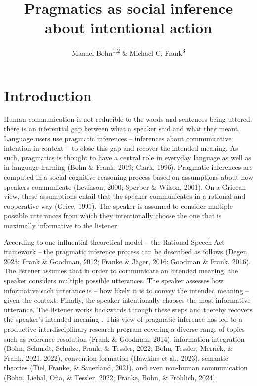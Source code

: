 \documentclass[
  man,floatsintext]{apa6}
\title{Pragmatics as social inference about intentional action}
\author{Manuel Bohn\textsuperscript{1,2} \& Michael C. Frank\textsuperscript{3}}
\date{}
\affiliation{\vspace{0.5cm}\textsuperscript{1} Institute of Psychology in Education, Leuphana University Lüneburg\\\textsuperscript{2} Department of Comparative Cultural Psychology, Max Planck Institute for Evolutionary Anthropology\\\textsuperscript{3} Department of Psychology, Stanford University}
\begin{document}
\maketitle

\section{Introduction}\label{introduction}

Human communication is not reducible to the words and sentences being uttered: there is an inferential gap between what a speaker said and what they meant. Language users use pragmatic inferences -- inferences about communicative intention in context -- to close this gap and recover the intended meaning. As such, pragmatics is thought to have a central role in everyday language as well as in language learning (Bohn \& Frank, 2019; Clark, 1996). Pragmatic inferences are computed in a social-cognitive reasoning process based on assumptions about how speakers communicate (Levinson, 2000; Sperber \& Wilson, 2001). On a Gricean view, these assumptions entail that the speaker communicates in a rational and cooperative way (Grice, 1991). The speaker is assumed to consider multiple possible utterances from which they intentionally choose the one that is maximally informative to the listener.

According to one influential theoretical model -- the Rational Speech Act framework -- the pragmatic inference process can be described as follows (Degen, 2023; Frank \& Goodman, 2012; Franke \& Jäger, 2016; Goodman \& Frank, 2016). The listener assumes that in order to communicate an intended meaning, the speaker considers multiple possible utterances. The speaker assesses how informative each utterance is -- how likely it is to convey the intended meaning -- given the context. Finally, the speaker intentionally chooses the most informative utterance. The listener works backwards through these steps and thereby recovers the speaker's intended meaning . This view of pragmatic inference has led to a productive interdisciplinary research program covering a diverse range of topics such as reference resolution (Frank \& Goodman, 2014), information integration (Bohn, Schmidt, Schulze, Frank, \& Tessler, 2022; Bohn, Tessler, Merrick, \& Frank, 2021, 2022), convention formation (Hawkins et al., 2023), semantic theories (Tiel, Franke, \& Sauerland, 2021), and even non-human communication (Bohn, Liebal, Oña, \& Tessler, 2022; Franke, Bohn, \& Fröhlich, 2024).
\end{document}
